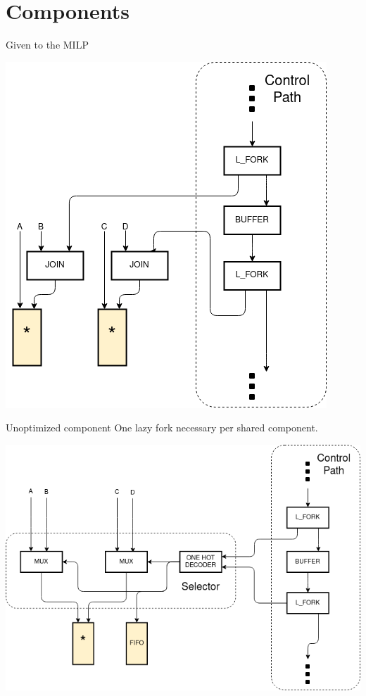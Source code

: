 \documentclass{beamer}
\begin{document}
\section{Components}
\begin{frame}{Given to the MILP}
\begin{center}
\includegraphics[scale=0.4]{given_to_milp(1).png}
\end{center}
\end{frame}

\begin{frame}{Unoptimized component}
One lazy fork necessary per shared component.
\begin{center}
\includegraphics[scale=0.4]{simple_selector.png}
\end{center}
\end{frame}
\end{document}
